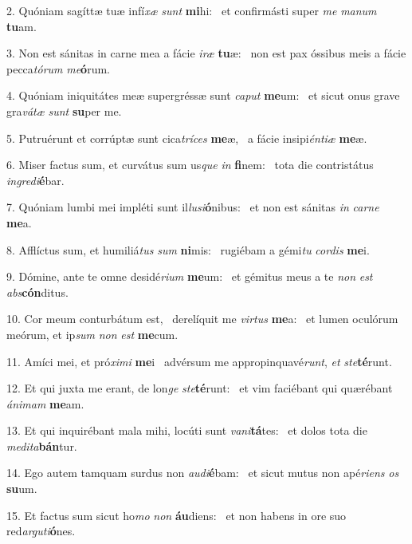 2. Quóniam sagíttæ tuæ infí\textit{xæ} \textit{sunt} \textbf{mi}hi: \ast\  et confirmásti super \textit{me} \textit{ma}\textit{num} \textbf{tu}am.\

3. Non est sánitas in carne mea a fácie \textit{i}\textit{ræ} \textbf{tu}æ: \ast\  non est pax óssibus meis a fácie pecca\textit{tó}\textit{rum} \textit{me}\textbf{ó}rum.\

4. Quóniam iniquitátes meæ supergréssæ sunt \textit{ca}\textit{put} \textbf{me}um: \ast\  et sicut onus grave gra\textit{vá}\textit{tæ} \textit{sunt} \textbf{su}per me.\

5. Putruérunt et corrúptæ sunt cica\textit{trí}\textit{ces} \textbf{me}æ, \ast\  a fácie insipi\textit{én}\textit{ti}\textit{æ} \textbf{me}æ.\

6. Miser factus sum, et curvátus sum us\textit{que} \textit{in} \textbf{fi}nem: \ast\  tota die contristátus \textit{in}\textit{gre}\textit{di}\textbf{é}bar.\

7. Quóniam lumbi mei impléti sunt il\textit{lu}\textit{si}\textbf{ó}nibus: \ast\  et non est sánitas \textit{in} \textit{car}\textit{ne} \textbf{me}a.\

8. Afflíctus sum, et humiliá\textit{tus} \textit{sum} \textbf{ni}mis: \ast\  rugiébam a gémi\textit{tu} \textit{cor}\textit{dis} \textbf{me}i.\

9. Dómine, ante te omne desidé\textit{ri}\textit{um} \textbf{me}um: \ast\  et gémitus meus a te \textit{non} \textit{est} \textit{abs}\textbf{cón}ditus.\

10. Cor meum conturbátum est, \dag\  derelíquit me \textit{vir}\textit{tus} \textbf{me}a: \ast\  et lumen oculórum meórum, et ip\textit{sum} \textit{non} \textit{est} \textbf{me}cum.\

11. Amíci mei, et pró\textit{xi}\textit{mi} \textbf{me}i \ast\  advérsum me appropinquavé\textit{runt}, \textit{et} \textit{ste}\textbf{té}runt.\

12. Et qui juxta me erant, de lon\textit{ge} \textit{ste}\textbf{té}runt: \ast\  et vim faciébant qui quærébant \textit{á}\textit{ni}\textit{mam} \textbf{me}am.\

13. Et qui inquirébant mala mihi, locúti sunt \textit{va}\textit{ni}\textbf{tá}tes: \ast\  et dolos tota die \textit{me}\textit{di}\textit{ta}\textbf{bán}tur.\

14. Ego autem tamquam surdus non \textit{au}\textit{di}\textbf{é}bam: \ast\  et sicut mutus non apé\textit{ri}\textit{ens} \textit{os} \textbf{su}um.\

15. Et factus sum sicut ho\textit{mo} \textit{non} \textbf{áu}diens: \ast\  et non habens in ore suo red\textit{ar}\textit{gu}\textit{ti}\textbf{ó}nes.\

